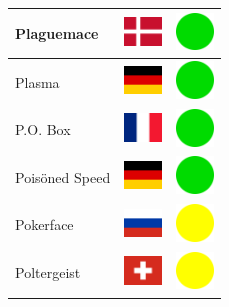\documentclass[12pt, a4paper, twoside]{report}
\begin{document}
\begin{center}
\begin{longtable}{|p{5cm}|p{2cm}|p{2cm}|}
 Plaguemace                                                 & \includegraphics[width=1cm]{../4x3/dk} &   \includegraphics[width=1cm]{../likes/y} \\ \hline
 Plasma                                                     & \includegraphics[width=1cm]{../4x3/de} &   \includegraphics[width=1cm]{../likes/y} \\ \hline
 P.O. Box                                                   & \includegraphics[width=1cm]{../4x3/fr} &   \includegraphics[width=1cm]{../likes/y} \\ \hline
 Poisöned Speed                                             & \includegraphics[width=1cm]{../4x3/de} &   \includegraphics[width=1cm]{../likes/y} \\ \hline
 Pokerface                                                  & \includegraphics[width=1cm]{../4x3/ru} &   \includegraphics[width=1cm]{../likes/m} \\ \hline
 Poltergeist                                                & \includegraphics[width=1cm]{../4x3/ch} &   \includegraphics[width=1cm]{../likes/m} \\ \hline

\end{longtable}
\end{center}
\end{document}
